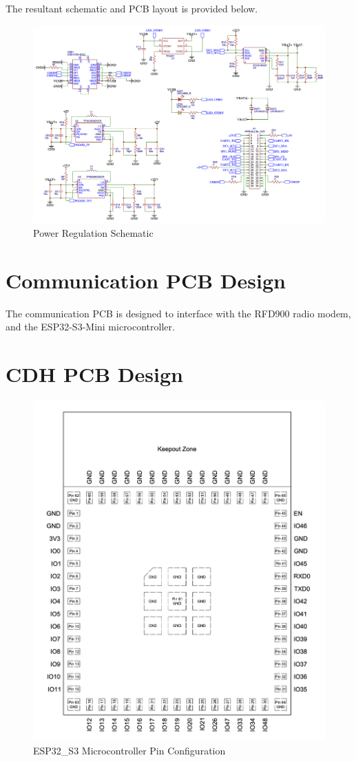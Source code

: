 \documentclass{report}
\begin{document}
            
            
            The resultant schematic and PCB layout is provided below.
            \begin{figure}[H]
                \centering
                \includegraphics[width=0.6\linewidth]{figures/PWR_SCHM.png}
                \caption{Power Regulation Schematic}
                \label{fig:power}
            \end{figure}



        \section{Communication PCB Design}
                The communication PCB is designed to interface with the RFD900 radio modem, and the ESP32-S3-Mini microcontroller.
        \section{CDH PCB Design}

            \begin{figure}[H]
                \centering
                \includegraphics[width=0.4\linewidth]{figures/MC_PINS.png}
                \caption{ESP32\_S3 Microcontroller Pin Configuration}
                \label{fig:mc_pins}
            \end{figure}
\end{document}
